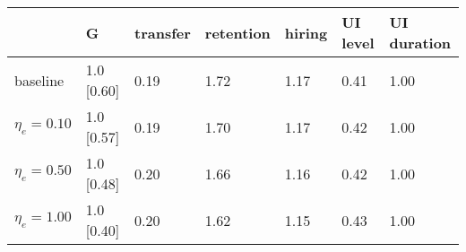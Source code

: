 \begin{tabular}{lllllll}
\toprule
 & \textbf{G} & \textbf{transfer} & \textbf{retention} & \textbf{hiring} & \textbf{UI level} & \textbf{UI duration} \\
\midrule
baseline & 1.0 [0.60] & 0.19 & 1.72 & 1.17 & 0.41 & 1.00 \\
$\eta_e = 0.10$ & 1.0 [0.57] & 0.19 & 1.70 & 1.17 & 0.42 & 1.00 \\
$\eta_e = 0.50$ & 1.0 [0.48] & 0.20 & 1.66 & 1.16 & 0.42 & 1.00 \\
$\eta_e = 1.00$ & 1.0 [0.40] & 0.20 & 1.62 & 1.15 & 0.43 & 1.00 \\
\bottomrule
\end{tabular}

